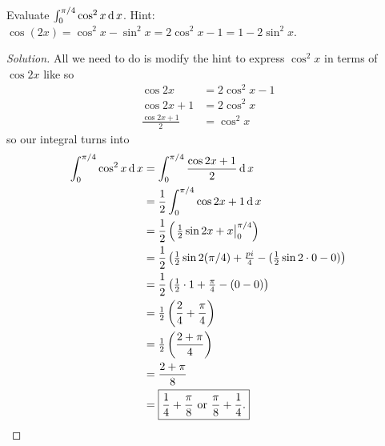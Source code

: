 \begin{problem}
Evaluate $\int_0^{\pi/4}\cos^2x\operatorname{d} x$. Hint:
$\cos(2x)=\cos^2x-\sin^2x=2\cos^2x-1=1-2\sin^2x$.
\end{problem}
\begin{proof}[Solution]
All we need to do is modify the hint to express $\cos^2 x$ in terms of
$\cos 2x$ like so
\begin{align*}
\cos 2x&=2\cos^2 x-1\\
\cos 2x+1&=2\cos^2 x\\
\frac{\cos 2x+1}{2}&=\cos^2x
\end{align*}
so our integral turns into
\begin{align*}
\int_0^{\pi/4}\cos^2 x\operatorname{d} x
&=\int_0^{\pi/4}\frac{\cos 2x+1}{2}\operatorname{d} x\\
&=\frac{1}{2}\int_0^{\pi/4}\cos 2x+1\operatorname{d} x\\
&=\frac{1}{2}\left(\left.\tfrac{1}{2}\sin 2x+x\right|_0^{\pi/4}\right)\\
&=\frac{1}{2}\left(\tfrac{1}{2}\sin 2(\pi/4)+\tfrac{pi}{4}-(\tfrac{1}{2}\sin 2\cdot
  0-0)\right)\\
&=\frac{1}{2}\left(\tfrac{1}{2}\cdot 1+\tfrac{\pi}{4}-(0-0)\right)\\
&=\tfrac{1}{2}\left(\frac{2}{4}+\frac{\pi}{4}\right)\\
&=\tfrac{1}{2}\left(\frac{2+\pi}{4}\right)\\
&=\frac{2+\pi}{8}\\
&=\boxed{\frac{1}{4}+\frac{\pi}{8}\text{ or }\frac{\pi}{8}+\frac{1}{4}.}\qedhere
\end{align*}
\end{proof}

